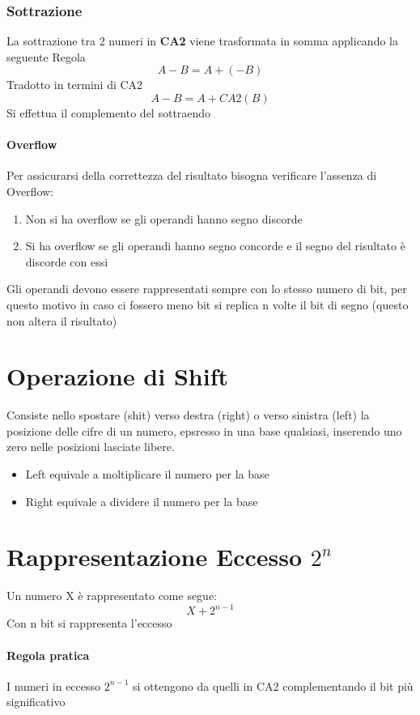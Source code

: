\documentclass[12pt, a4paper, openany]{book}
\begin{document}
\subsubsection{Sottrazione}
La sottrazione tra 2 numeri in \textbf{CA2} viene trasformata in somma applicando la seguente Regola
\begin{equation}
    A-B=A+(-B)
\end{equation}
Tradotto in termini di CA2
\begin{equation}
    A-B=A+CA2(B)
\end{equation}
Si effettua il complemento del sottraendo
\paragraph{Overflow} Per assicurarsi della correttezza del risultato bisogna verificare l'assenza di 
Overflow:
\begin{enumerate}
    \item Non si ha overflow se gli operandi hanno segno discorde
    \item Si ha overflow se gli operandi hanno segno concorde e il segno del risultato è discorde con essi
\end{enumerate}
Gli operandi devono essere rappresentati sempre con lo stesso numero di bit, per questo motivo
in caso ci fossero meno bit si replica n volte il bit di segno (questo non altera il risultato)

\section{Operazione di Shift}
Consiste nello spostare (shit) verso destra (right) o verso sinistra (left) la posizione delle cifre di un numero, epsresso in una base qualsiasi, inserendo uno zero
nelle posizioni lasciate libere.
\begin{itemize}
    \item Left equivale a moltiplicare il numero per la base
    \item Right equivale a dividere il numero per la base
\end{itemize}
\section{Rappresentazione Eccesso $2^n$}
Un numero X è rappresentato come segue:
\begin{equation}
    X+2^{n-1}
\end{equation}
Con n bit si rappresenta l'eccesso
\paragraph{Regola pratica} I numeri in eccesso $2^{n-1}$ si ottengono da quelli in CA2
complementando il bit più significativo
\end{document}

